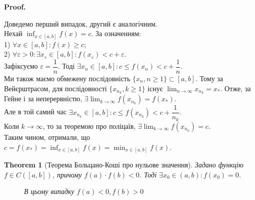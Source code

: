 \documentclass[a4paper, 14pt]{article}
\makeatletter
\def\qed{$\blacksquare$}
\theoremstyle{theoremdd}
\newtheorem{theorem}{Theorem}[subsection]
\theoremstyle{theoremdd}
\theoremstyle{theoremdd}
\theoremstyle{theoremdd}
\theoremstyle{theoremdd}
\theoremstyle{theoremdd}
\theoremstyle{theoremdd}
\theoremstyle{theoremdd}
\renewenvironment{proof}[1][Proof.\\]{\par
\pushQED{\hfill \qed}%
\normalfont \topsep6\p@\@plus6\p@\relax
\trivlist
\item\relax
{\bfseries
#1\@addpunct{.}}\hspace\labelsep\ignorespaces
}{%
\popQED\endtrivlist\@endpefalse
}
\makeatother
\begin{document}
\begin{proof}
Доведемо перший випадок, другий є аналогічним.\\
Нехай $\displaystyle \inf_{x \in [a,b]} f(x) = c$. За означенням:\\
1) $\forall x \in [a,b]: f(x) \geq c$;\\
2) $\forall \varepsilon > 0: \exists x_{\varepsilon} \in [a,b]: f(x_{\varepsilon}) < c + \varepsilon$.\\
Зафіксуємо $\varepsilon = \dfrac{1}{n}$. Тоді $\exists x_n \in [a,b]: c \leq f(x_n) < c + \dfrac{1}{n}$.\\
Ми також маємо обмежену послідовність $\{x_n, n \geq 1\} \subset [a,b]$. Тому за Вейєрштрасом, для послідовності $\{x_{n_k},k \geq 1\}$ існує $\displaystyle \lim_{n \to \infty} x_{n_k} = x_*$. Отже, за Гейне і за неперервністю, $\displaystyle \exists \lim_{k \to \infty} f(x_{n_k}) = f(x_*)$.\\
Але в той самий час $\exists x_{n_k} \in [a,b]: c \leq f(x_{n_k}) < c + \dfrac{1}{n_k}$.\\
Коли $k \to \infty$, то за теоремою про поліцаїв, $\exists \displaystyle \lim_{k \to \infty} f(x_{n_k}) = c$.\\
Таким чином, отримали, що $c = f(x_*) = \displaystyle \inf_{x \in [a,b]} f(x) = \min_{x \in [a,b]} f(x)$.
\end{proof}

\begin{theorem}[Теорема Больцано-Коші про нульове значення]
Задано функцію $f \in C([a,b])$, причому $f(a) \cdot f(b) < 0$. Тоді $\exists x_0 \in (a,b): f(x_0) = 0$.
\begin{figure}[H]
\centering
{}
\caption*{В цьому випадку $f(a) < 0, f(b) > 0$}
\end{figure}
\end{theorem}
\end{document}
